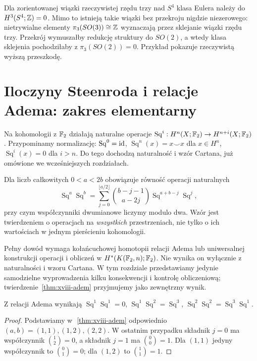 \begin{przyklad}
Dla zorientowanej wiązki rzeczywistej rzędu trzy nad
$S^4$ klasa Eulera należy do $H^3(S^4;\mathbb{Z})=0$.
Mimo to istnieją takie wiązki bez przekroju nigdzie
niezerowego: nietrywialne elementy
$\pi_3(SO(3))\cong\mathbb{Z}$ wyznaczają przez sklejanie
wiązki rzędu trzy. Przekrój wymuszałby redukcję
struktury do $SO(2)$, a wtedy klasa sklejenia pochodziłaby
z $\pi_3(SO(2))=0$.
Przykład pokazuje rzeczywistą wyższą przeszkodę.
\end{przyklad}

\section{Iloczyny Steenroda i relacje Adema: zakres elementarny}
Na kohomologii z $\mathbb{F}_2$ działają naturalne operacje
$\operatorname{Sq}^i:H^n(X;\mathbb{F}_2)\to H^{n+i}(X;\mathbb{F}_2)$.
Przypominamy normalizację:
$\operatorname{Sq}^0=\mathrm{id}$,
$\operatorname{Sq}^n(x)=x\smile x$ dla $x\in H^n$,
$\operatorname{Sq}^i(x)=0$ dla $i>n$.
Do tego dochodzą naturalność i wzór Cartana, już omówione
we wcześniejszych rozdziałach.
\begin{twierdzenie}[Relacje Adema, $p=2$]
\label{thm:xviii-adem}
Dla liczb całkowitych $0<a<2b$ obowiązuje równość
operacji naturalnych
\[
\operatorname{Sq}^a\operatorname{Sq}^b=
\sum_{j=0}^{\lfloor a/2\rfloor}
\binom{b-j-1}{a-2j}
\operatorname{Sq}^{a+b-j}\operatorname{Sq}^{j},
\]
przy czym współczynniki dwumianowe liczymy modulo dwa.
Wzór jest twierdzeniem o operacjach na \emph{wszystkich}
przestrzeniach, nie tylko o ich wartościach w jednym pierścieniu
kohomologii.
\end{twierdzenie}
\begin{uwaga}
Pełny dowód wymaga kołańcuchowej homotopii relacji Adema
lub uniwersalnej konstrukcji operacji i obliczeń w
$H^*(K(\mathbb{F}_2,n);\mathbb{F}_2)$. Nie wynika on wyłącznie z
naturalności i wzoru Cartana. W tym rozdziale przedstawiamy
jedynie samodzielne wyprowadzenia kilku konsekwencji i
kontrolę obliczeniową; twierdzenie~\ref{thm:xviii-adem}
przyjmujemy jako zewnętrzny wynik.
\end{uwaga}
\begin{stwierdzenie}
Z relacji Adema wynikają
$\operatorname{Sq}^1\operatorname{Sq}^1=0$,
$\operatorname{Sq}^1\operatorname{Sq}^2=\operatorname{Sq}^3$,
$\operatorname{Sq}^2\operatorname{Sq}^2=
\operatorname{Sq}^3\operatorname{Sq}^1$.
\end{stwierdzenie}
\begin{proof}
Podstawiamy w\,~\ref{thm:xviii-adem} odpowiednio
$(a,b)=(1,1),(1,2),(2,2)$. W ostatnim przypadku
składnik $j=0$ ma współczynnik
$\binom{1}{2}=0$, a składnik $j=1$ ma
$\binom{0}{0}=1$. Dla $(1,1)$ jedyny współczynnik to
$\binom{0}{1}=0$; dla $(1,2)$ to $\binom{1}{1}=1$.
\end{proof}
